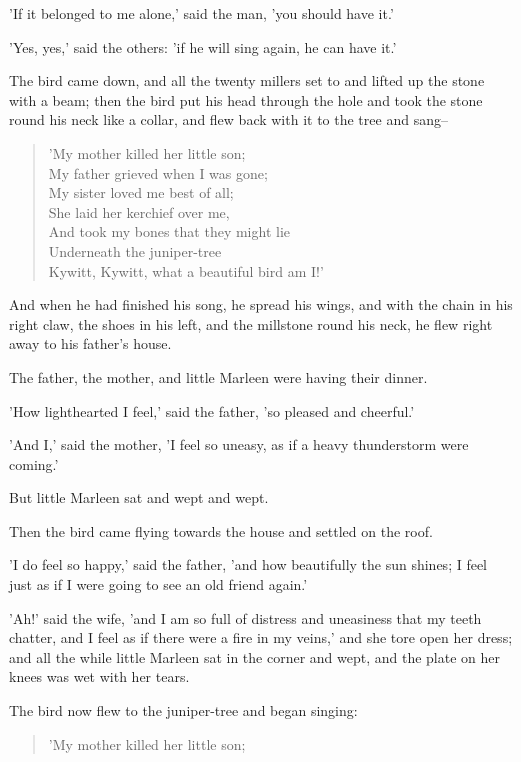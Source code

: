 \documentclass[12pt]{book}
\begin{document}
'If it belonged to me alone,' said the man, 'you should have it.'

'Yes, yes,' said the others: 'if he will sing again, he can have it.'

The bird came down, and all the twenty millers set to and lifted up
the stone with a beam; then the bird put his head through the hole and
took the stone round his neck like a collar, and flew back with it to
the tree and sang--

\begin{verse}
 'My mother killed her little son;\\
  My father grieved when I was gone;\\
  My sister loved me best of all;\\
  She laid her kerchief over me,\\
  And took my bones that they might lie\\
  Underneath the juniper-tree\\
  Kywitt, Kywitt, what a beautiful bird am I!'
\end{verse}

And when he had finished his song, he spread his wings, and with the
chain in his right claw, the shoes in his left, and the millstone
round his neck, he flew right away to his father's house.

The father, the mother, and little Marleen were having their dinner.

'How lighthearted I feel,' said the father, 'so pleased and cheerful.'

'And I,' said the mother, 'I feel so uneasy, as if a heavy
thunderstorm were coming.'

But little Marleen sat and wept and wept.

Then the bird came flying towards the house and settled on the roof.

'I do feel so happy,' said the father, 'and how beautifully the sun
shines; I feel just as if I were going to see an old friend again.'

'Ah!' said the wife, 'and I am so full of distress and uneasiness that
my teeth chatter, and I feel as if there were a fire in my veins,' and
she tore open her dress; and all the while little Marleen sat in the
corner and wept, and the plate on her knees was wet with her tears.

The bird now flew to the juniper-tree and began singing:

\begin{verse}
 'My mother killed her little son;
\end{verse}
\end{document}
